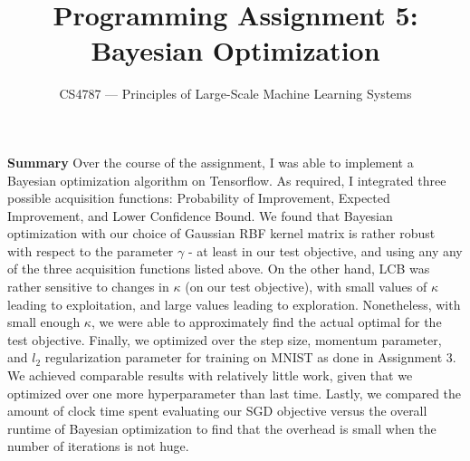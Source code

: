 \documentclass[10pt]{article}
\begin{document}
\title{Programming Assignment 5: Bayesian Optimization}
\author{CS4787 --- Principles of Large-Scale Machine Learning Systems}
\date{}

\maketitle
\textbf{Summary} 
Over the course of the assignment, I was able to implement a Bayesian optimization algorithm on Tensorflow. As required, I integrated three possible acquisition functions: Probability of Improvement, Expected Improvement, and Lower Confidence Bound. We found that Bayesian optimization with our choice of Gaussian RBF kernel matrix is rather robust with respect to the parameter $\gamma$ - at least in our test objective, and using any any of the three acquisition functions listed above. On the other hand, LCB was rather sensitive to changes in $\kappa$ (on our test objective), with small values of $\kappa$ leading to exploitation, and large values leading to exploration. Nonetheless, with small enough $\kappa$, we were able to approximately find the actual optimal for the test objective. Finally, we optimized over the step size, momentum parameter, and $l_2$ regularization parameter for training on MNIST as done in Assignment 3. We achieved comparable results with relatively little work, given that we optimized over one more hyperparameter than last time. Lastly, we compared the amount of clock time spent evaluating our SGD objective versus the overall runtime of Bayesian optimization to find that the overhead is small when the number of iterations is not huge.
\end{document}
